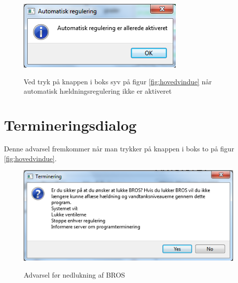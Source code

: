 \begin{figure}[h]
\centering
\includegraphics[scale=1]{billeder/GUI/auto2}
\label{fig:auto1}
\caption{Ved tryk på knappen i boks syv på figur \ref{fig:hovedvindue} når automatisk hældningsregulering ikke er aktiveret}
\end{figure}

\section*{Termineringsdialog}
Denne advarsel fremkommer når man trykker på knappen i boks to på figur \ref{fig:hovedvindue}.
\begin{figure}[h]
\centering
\includegraphics[scale=1]{billeder/GUI/termineringsvindue}
\label{fig:terminering}
\caption{Advarsel før nedlukning af BROS}
\end{figure}
